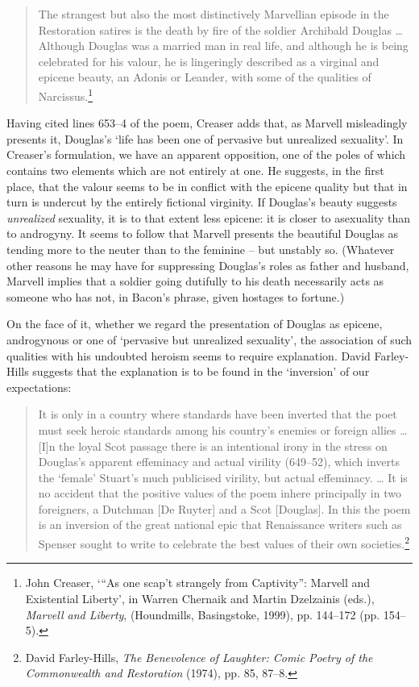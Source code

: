 ﻿\documentclass[12pt]{article}
\newcommand{\citedtitle}[1]{\textit{#1}}
\begin{document}
\begin{quote}
The strangest but also the most distinctively Marvellian episode in the Restoration
satires is the death by fire of the soldier Archibald Douglas … Although
Douglas was a married man in real life, and although he is being celebrated for
his valour, he is lingeringly described as a virginal and epicene beauty, an
Adonis or Leander, with some of the qualities of Narcissus.\footnote{John Creaser, ‘“As one
scap’t strangely from Captivity”: Marvell and Existential Liberty’, in Warren
Chernaik and Martin Dzelzainis (eds.), \citedtitle{Marvell and Liberty}, (Houndmills,
Basingstoke, 1999),  pp. 144–172 (pp. 154–5).}
\end{quote}

Having
cited lines 653–4 of the poem, Creaser adds that, as Marvell misleadingly
presents it, Douglas’s ‘life has been one of pervasive but unrealized
sexuality’. In Creaser’s formulation, we have an apparent opposition, one of the
poles of which contains two elements which are not entirely at one. He
suggests, in the first place, that the valour seems to be in conflict with the
epicene quality but that in turn is undercut by the entirely fictional
virginity. If Douglas’s beauty suggests \emph{unrealized} sexuality, it is to
that extent less epicene: it is closer to asexuality than to androgyny. It
seems to follow that Marvell presents the beautiful Douglas as tending more to
the neuter than to the feminine – but unstably so. (Whatever other reasons he
may have for suppressing Douglas’s roles as father and husband, Marvell implies
that a soldier going dutifully to his death necessarily acts as someone who has
not, in Bacon’s phrase, given hostages to fortune.)

On
the face of it, whether we regard the presentation of Douglas as epicene,
androgynous or one of ‘pervasive but unrealized sexuality’, the association of
such qualities with his undoubted heroism seems to require explanation. David
Farley-Hills suggests that the explanation is to be found in the ‘inversion’ of
our expectations:

\begin{quote}
It is only in a country where standards have been inverted that the poet must seek heroic standards among his country’s enemies or foreign allies … [I]n the loyal Scot passage there is an intentional irony in the stress on Douglas’s apparent effeminacy and actual virility (649–52), which inverts the ‘female’ Stuart’s much publicised virility, but actual effeminacy. … It is no accident that the positive values of the poem inhere principally in two foreigners, a Dutchman [De Ruyter] and a Scot [Douglas]. In this the poem is an inversion of the great national epic that Renaissance writers such as Spenser sought to write to celebrate the best values of their own societies.\footnote{David Farley-Hills, \citedtitle{The Benevolence of Laughter: Comic Poetry of the Commonwealth and Restoration} (1974), pp. 85, 87–8.}
\end{quote}
\end{document}
